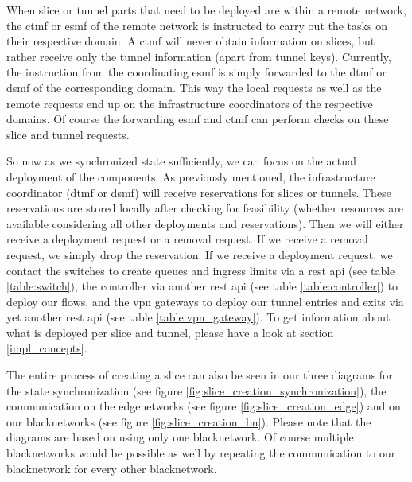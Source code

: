 When slice or tunnel parts that need to be deployed are within a remote network, the \acrshort{ctmf} or \acrshort{esmf} of the remote network is instructed to carry out the tasks on their respective domain. A \acrshort{ctmf} will never obtain information on slices, but rather receive only the tunnel information (apart from tunnel keys). Currently, the instruction from the coordinating \acrshort{esmf} is simply forwarded to the \acrshort{dtmf} or \acrshort{dsmf} of the corresponding domain. This way the local requests as well as the remote requests end up on the infrastructure coordinators of the respective domains. Of course the forwarding \acrshort{esmf} and \acrshort{ctmf} can perform checks on these slice and tunnel requests.

So now as we synchronized state sufficiently, we can focus on the actual deployment of the components. As previously mentioned, the infrastructure coordinator (\acrshort{dtmf} or \acrshort{dsmf}) will receive reservations for slices or tunnels. These reservations are stored locally after checking for feasibility (whether resources are available considering all other deployments and reservations). Then we will either receive a deployment request or a removal request. If we receive a removal request, we simply drop the reservation. If we receive a deployment request, we contact the switches to create queues and ingress limits via a \acrshort{rest} \acrshort{api} (see table \ref{table:switch}), the controller via another \acrshort{rest} \acrshort{api} (see table \ref{table:controller}) to deploy our flows, and the \acrshort{vpn} gateways to deploy our tunnel entries and exits via yet another \acrshort{rest} \acrshort{api} (see table \ref{table:vpn_gateway}). To get information about what is deployed per slice and tunnel, please have a look at section \ref{impl_concepts}.

The entire process of creating a slice can also be seen in our three diagrams for the state synchronization (see figure \ref{fig:slice_creation_synchronization}), the communication on the \gls{edgenetwork}s (see figure \ref{fig:slice_creation_edge}) and on our \gls{blacknetwork}s (see figure \ref{fig:slice_creation_bn}). Please note that the diagrams are based on using only one \gls{blacknetwork}. Of course multiple \gls{blacknetwork}s would be possible as well by repeating the communication to our \gls{blacknetwork} for every other \gls{blacknetwork}.

\newpage

